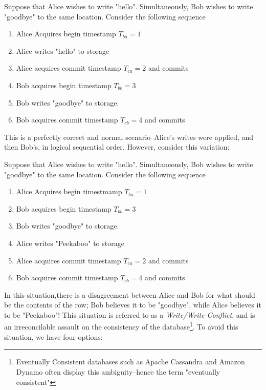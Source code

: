 \begin{exmp}
	Suppose that Alice wishes to write "hello". Simultaneously, Bob wishes to write "goodbye" to the same location. Consider the following sequence
	\begin{enumerate}
		\item Alice Acquires begin timestamp $T_{ba} = 1$
		\item Alice writes "hello" to storage
		\item Alice acquires commit timestamp $T_{ca} = 2$ and commits
		\item Bob acquires begin timestamp $T_{bb} = 3$
		\item Bob writes "goodbye" to storage. 
		\item Bob acquires commit timestamp $T_{cb} = 4$ and commits
	\end{enumerate}
\end{exmp}
This is a perfectly correct and normal scenario--Alice's writes were applied, and then Bob's, in logical sequential order. However, consider this variation:
\begin{exmp}
	Suppose that Alice wishes to write "hello". Simultaneously, Bob wishes to write "goodbye" to the same location. Consider the following sequence
	\begin{enumerate}
		\item Alice Acquires begin timestmamp $T_{ba} = 1$
		\item Bob acquires begin timestamp $T_{bb} = 3$
		\item Bob writes "goodbye" to storage. 
		\item Alice writes "Peekaboo" to storage
		\item Alice acquires commit timestamp $T_{ca} = 2$ and commits
		\item Bob acquires commit timestamp $T_{cb} = 4$ and commits
	\end{enumerate}
\end{exmp}
In this situation,there is a disagreement between Alice and Bob for what should be the contents of the row; Bob believes it to be "goodbye", while Alice believes it to be "Peekaboo"! This situation is referred to as a \emph{Write/Write Conflict}, and is an irreconcilable assault on the consistency of the database\footnote{Eventually Consistent databases such as Apache Cassandra and Amazon Dynamo often display this ambiguity--hence the term "eventually consistent"}. To avoid this situation, we have four options: 

